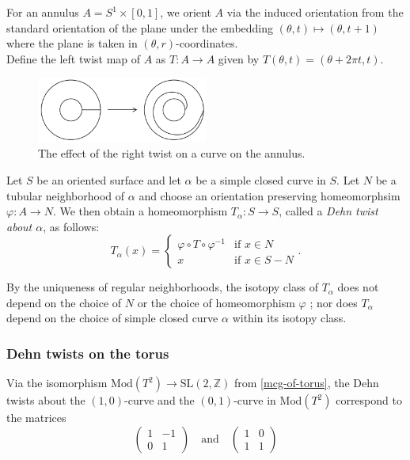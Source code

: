 \documentclass[reqno]{amsart}
\theoremstyle{definition}
\theoremstyle{remark}
\newcommand{\SL}{{\mathrm{SL}}}
\newcommand{\Mod}{{\mathrm{Mod}}}
\begin{document}
For an annulus $A = S^{1} \times \left[ 0,1 \right]$, we
orient $A$ via the induced orientation from
the standard orientation of the plane under the
embedding 
$\left( \theta, t \right) \mapsto 
\left( \theta, t+1 \right) $ where
the plane is taken in $\left( \theta, r \right) $-coordinates.\\

Define the left twist map of $A$ as $T \colon A \to A$ given
by
$T\left( \theta, t \right) = \left( \theta
+ 2\pi t, t\right) $.

\begin{figure}[H]
    \centering
    \includegraphics[width=0.5\textwidth]{dehn-twist-annulus.png}
    \caption{The effect of the right twist on a curve
    on the annulus.}
    \label{fig:dehn-twist-annulus-png}
\end{figure}

Let $S$ be an oriented surface and let $\alpha$ be
a simple closed curve in $S$. Let $N$ be a tubular
neighborhood of $\alpha$ and choose
an orientation preserving homeomorphsim
$\varphi \colon A \to N$. We then obtain
a homeomorphism $T_{\alpha} \colon
S \to S$, called a \textit{Dehn twist about $\alpha$}, as
follows:
\[
T_{\alpha}(x) = 
\begin{cases}
    \varphi \circ T \circ \varphi^{-1}& \text{if } 
    x\in N \\
    x& \text{if } x\in S - N
\end{cases}.
\] 

By the uniqueness of regular neighborhoods, the isotopy
class of $T_{\alpha}$ does not depend on the choice of
$N$ or the choice of homeomorphism $\varphi$ \cite[Theorem 1.8]{Hempel}; nor
does $T_{\alpha}$ depend on the choice
of simple closed curve $\alpha$ within its isotopy class. 


\subsubsection*{Dehn twists on the torus}
Via the isomorphism
$\Mod \left( T^2 \right)  \to \SL\left( 2, \mathbb{Z} \right) $ 
from \ref{mcg-of-torus}, the Dehn twists
about the $(1,0)$-curve and the $(0,1)$-curve
in $\Mod\left( T^2 \right) $ correspond to the
matrices
\[
    \begin{pmatrix} 1 & -1 \\ 0 & 1 \end{pmatrix} 
    \quad \text{and} \quad 
    \begin{pmatrix} 1 & 0 \\ 1 & 1 \end{pmatrix} 
\] 
\end{document}
